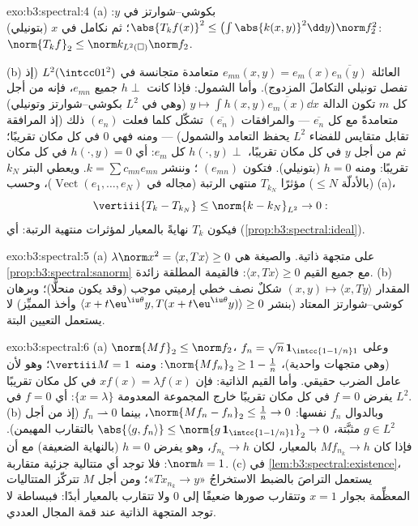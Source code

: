 \begin{solution}{exo:b3:spectral:4}
(a) بكوشي--شوارتز في $y$: $\abs{T_kf(x)}^2 \leq
\bigl(\int\abs{k(x,y)}^2\dd y\bigr)\norm f_2^2$؛ ثم نكامل في $x$ (بتونيلي):
$\norm{T_kf}_2 \leq \norm k_{L^2(\square)}
\norm f_2$.

(b) العائلة $e_{mn}(x,y) = e_m(x)\overline{e_n(y)}$ متعامدة متجانسة في $L^2(\intcc01^2)$ (إذ تفصل تونيلي
التكاملَ المزدوج). وأما الشمول: فإذا كانت $h \perp$ جميع
$e_{mn}$، فإنه من أجل كل $m$ تكون الدالة $y \mapsto \int h(x,y)\overline{e_m(x)}\dd
x$ (وهي في $L^2$
بكوشي--شوارتز وتونيلي) متعامدةً مع كل $\overline{e_n}$ ---
والمرافقات $(\overline{e_n})$ تشكّل  كلما فعلت $(e_n)$
ذلك (إذ المرافقة تقابل متقايس للفضاء $L^2$ يحفظ التعامد
والشمول) --- ومنه فهي $0$ في كل مكان تقريبًا؛ ثم من أجل $y$ في
كل مكان تقريبًا، $h(\cdot, y) \perp$ كل $e_m$: أي $h(\cdot, y) = 0$ في كل مكان تقريبًا:
ومنه $h = 0$ (بتونيلي). فتكون $(e_{mn})$ ؛
وننشر $k = \sum c_{mn}e_{mn}$. ويعطي البتر $k_N$ (بالأدلّة $\leq N$) مؤثرًا
$T_{k_N}$ منتهي الرتبة (مجاله في $\operatorname{Vect}(e_1, \dots,
e_N)$)، وحسب (a)،
\[
\vertiii{T_k - T_{k_N}} \leq \norm{k - k_N}_{L^2} \to 0 :
\]
فيكون $T_k$ نهايةً بالمعيار لمؤثرات منتهية الرتبة: أي 
(\cref{prop:b3:spectral:ideal}).
\end{solution}

\begin{solution}{exo:b3:spectral:5}
(a) $\lambda\norm x^2 = \langle x, Tx\rangle \geq 0$ على متجهة ذاتية. والصيغة هي \cref{prop:b3:spectral:sanorm} مع جميع
القيم $\langle x,
Tx\rangle \geq 0$: فالقيمة المطلقة زائدة.
(b) المقدار $(x, y) \mapsto \langle x, Ty\rangle$ شكلٌ نصف خطي إرميتي موجب (وقد يكون منحلًّا)؛
وبرهان كوشي--شوارتز المعتاد (بنشر $\langle x + t\eu^{\iu\theta}y,
T(x + t\eu^{\iu\theta}y)\rangle \geq 0$ وأخذ المميِّز) لا
يستعمل التعيين البتة.
\end{solution}

\begin{solution}{exo:b3:spectral:6}
(a) $\norm{Mf}_2 \leq \norm f_2$، وعلى $f_n = \sqrt n\,
\mathbf 1_{\intcc{1 - 1/n}1}$ (وهي متجهات واحدية)، $\norm{Mf_n}_2
\geq 1 - \frac1n$: ومنه
$\vertiii M = 1$؛ وهو  لأن عامل الضرب حقيقي. وأما
القيم الذاتية: فإن $xf(x) = \lambda f(x)$ في كل مكان تقريبًا يفرض $f = 0$ في كل
مكان تقريبًا خارج المجموعة المعدومة $\{x = \lambda\}$: أي $f =
0$ في $L^2$.
(b) وبالدوال $f_n$ نفسها: $\norm{Mf_n - f_n}_2 \leq \frac1n \to
0$، بينما $f_n \rightharpoonup 0$ (إذ من أجل
$g \in L^2$ مثبَّتة، $\abs{\langle g, f_n\rangle} \leq \norm{g\,\mathbf
1_{\intcc{1-1/n}1}}_2 \to 0$ بالتقارب المهيمن). فإذا كان
$Mf_{n_k} \to h$ بالمعيار، لكان $f_{n_k} \to h$، وهو يفرض $h = 0$
(بالنهاية الضعيفة) مع أن $\norm h = 1$: فلا توجد أي متتالية
جزئية متقاربة.
(c) في \cref{lem:b3:spectral:existence}، يستعمل التراصَ بالضبط الاستخراجُ
«$Tx_{n_k} \to y$»؛ ومن أجل $M$ تتركّز المتتاليات المعظِّمة
بجوار $x = 1$ وتتقارب صورها ضعيفًا إلى $0$ ولا تتقارب بالمعيار
أبدًا: فببساطة لا توجد المتجهة الذاتية عند قمة المجال العددي.
\end{solution}

